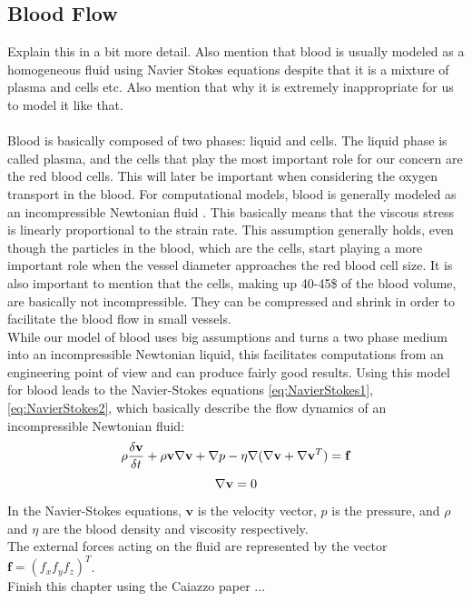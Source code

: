 \subsection{Blood Flow}
\label{Blood Flow}

{\color{brown}
  Explain this in a bit more detail. 
  Also mention that blood is usually modeled as a homogeneous fluid using Navier Stokes
  equations despite that it is a mixture of plasma and cells etc.
  Also mention that why it is extremely inappropriate for us to model it like that.
}
\\
\\Blood is basically composed of two phases: liquid and cells. The liquid phase is called plasma, and the cells that play the most important role for our concern are the red blood cells. This will later be important when considering the oxygen transport in the blood. For computational models, blood is generally modeled as an incompressible Newtonian fluid \cite{mathmodeling}. This basically means that the viscous stress is linearly proportional to the strain rate. This assumption generally holds, even though the particles in the blood, which are the cells, start playing a more important role when the vessel diameter approaches the red blood cell size. It is also important to mention that the cells, making up 40-45\$ of the blood volume, are basically not incompressible. They can be compressed and shrink in order to facilitate the blood flow in small vessels.
\\While our model of blood uses big assumptions and turns a two phase medium into an incompressible Newtonian liquid, this facilitates computations from an engineering point of view and can produce fairly good results.
Using this model for blood leads to the Navier-Stokes equations \ref{eq:NavierStokes1}, \ref{eq:NavierStokes2}, which basically describe the flow dynamics of an incompressible Newtonian fluid:
\begin{equation}
\\ \rho \frac{\delta \textbf{v}}{\delta t} + \rho \textbf{v} \nabla \textbf{v} + \nabla p - \eta \nabla ( \nabla \textbf{v} + \nabla \textbf{v}^T ) = \textbf{f}
\label{eq:NavierStokes1}
\end{equation}
\begin{equation}
\\ \nabla \textbf{v} = 0
\label{eq:NavierStokes2}
\end{equation}
In the Navier-Stokes equations, $\textbf{v}$ is the velocity vector, $p$ is the pressure, and $\rho$ and $\eta$ are the blood density and viscosity respectively.
\\The external forces acting on the fluid are represented by the vector $\textbf{f} = (f_x f_y f_z)^T$.
\\Finish this chapter using the Caiazzo paper \cite{mathmodeling}...

